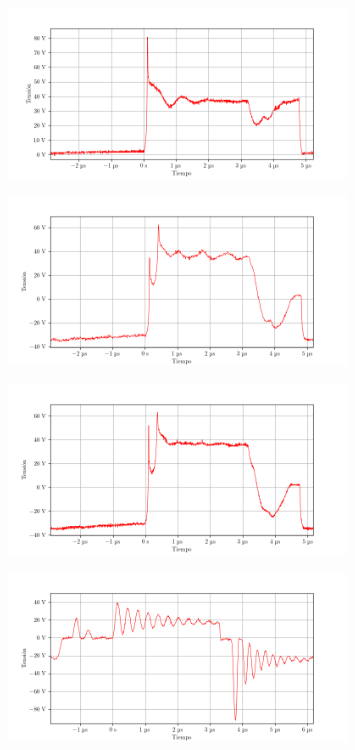 \begin{figure}[ht]
    \centering
    \includegraphics[width=0.8\textwidth]{images/capturas-osciloscopio/17-11-2022/37.png}
    \caption{}
    \label{fig:osc:37}
\end{figure}

\begin{figure}[ht]
    \centering
    \includegraphics[width=0.8\textwidth]{images/capturas-osciloscopio/17-11-2022/38.png}
    \caption{}
    \label{fig:osc:38}
\end{figure}

\begin{figure}[ht]
    \centering
    \includegraphics[width=0.8\textwidth]{images/capturas-osciloscopio/17-11-2022/39.png}
    \caption{}
    \label{fig:osc:39}
\end{figure}

\begin{figure}[ht]
    \centering
    \includegraphics[width=0.8\textwidth]{images/capturas-osciloscopio/17-11-2022/40.png}
    \caption{}
    \label{fig:osc:40}
\end{figure}

